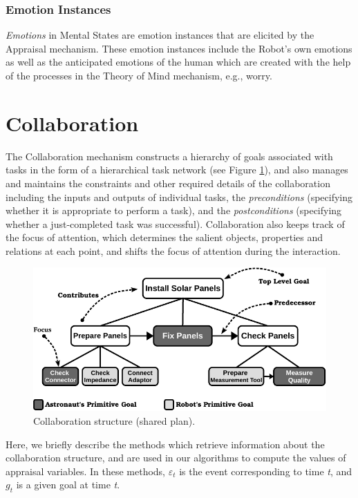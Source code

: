 \subsubsection{Emotion Instances}

\textit{Emotions} in Mental States are emotion instances that are elicited by
the Appraisal mechanism. These emotion instances include the Robot's own
emotions as well as the anticipated emotions of the human which are created with
the help of the processes in the Theory of Mind mechanism, e.g., worry.

\section{Collaboration}

The Collaboration mechanism constructs a hierarchy of goals associated with
tasks in the form of a hierarchical task network (see Figure \ref{fig:cs}), and
also manages and maintains the constraints and other required details of the
collaboration including the inputs and outputs of individual tasks, the
\textit{preconditions} (specifying whether it is appropriate to perform a task),
and the \textit{postconditions} (specifying whether a just-completed task was
successful). Collaboration also keeps track of the focus of attention, which
determines the salient objects, properties and relations at each point, and
shifts the focus of attention during the interaction.

\begin{figure}[tbh]
  \centering
  \includegraphics[width=\textwidth]{figure/collaborationStructure-croped.pdf}
  \caption{{\fontsize{9}{9}\selectfont Collaboration structure (shared plan).}}
  \label{fig:cs}
\end{figure}

Here, we briefly describe the methods which retrieve information about the
collaboration structure, and are used in our algorithms to compute the values of
appraisal variables. In these methods, $\varepsilon_t$ is the event
corresponding to time \textit{t}, and $g_t$ is a given goal at time \textit{t}.

